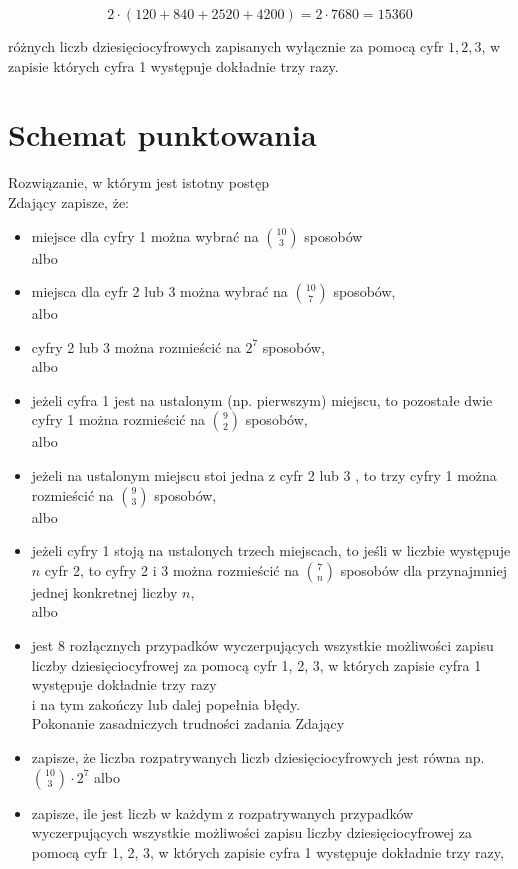 \documentclass[10pt]{article}
\begin{document}
$$
2 \cdot(120+840+2520+4200)=2 \cdot 7680=15360
$$

różnych liczb dziesięciocyfrowych zapisanych wyłącznie za pomocą cyfr $1,2,3$, w zapisie których cyfra 1 występuje dokładnie trzy razy.

\section*{Schemat punktowania}
Rozwiązanie, w którym jest istotny postęp\\
Zdający zapisze, że:

\begin{itemize}
  \item miejsce dla cyfry 1 można wybrać na $\binom{10}{3}$ sposobów\\
albo
  \item miejsca dla cyfr 2 lub 3 można wybrać na $\binom{10}{7}$ sposobów,\\
albo
  \item cyfry 2 lub 3 można rozmieścić na $2^{7}$ sposobów,\\
albo
  \item jeżeli cyfra 1 jest na ustalonym (np. pierwszym) miejscu, to pozostałe dwie cyfry 1 można rozmieścić na $\binom{9}{2}$ sposobów,\\
albo
  \item jeżeli na ustalonym miejscu stoi jedna z cyfr 2 lub 3 , to trzy cyfry 1 można rozmieścić na $\binom{9}{3}$ sposobów,\\
albo
  \item jeżeli cyfry 1 stoją na ustalonych trzech miejscach, to jeśli w liczbie występuje $n$ cyfr 2, to cyfry 2 i 3 można rozmieścić na $\binom{7}{n}$ sposobów dla przynajmniej jednej konkretnej liczby $n$,\\
albo
  \item jest 8 rozłącznych przypadków wyczerpujących wszystkie możliwości zapisu liczby dziesięciocyfrowej za pomocą cyfr 1, 2, 3, w których zapisie cyfra 1 występuje dokładnie trzy razy\\
i na tym zakończy lub dalej popełnia błędy.\\
Pokonanie zasadniczych trudności zadania Zdający
  \item zapisze, że liczba rozpatrywanych liczb dziesięciocyfrowych jest równa np. $\binom{10}{3} \cdot 2^{7}$ albo
  \item zapisze, ile jest liczb w każdym z rozpatrywanych przypadków wyczerpujących wszystkie możliwości zapisu liczby dziesięciocyfrowej za pomocą cyfr 1, 2, 3, w których zapisie cyfra 1 występuje dokładnie trzy razy,\\

\end{itemize}
\end{document}
